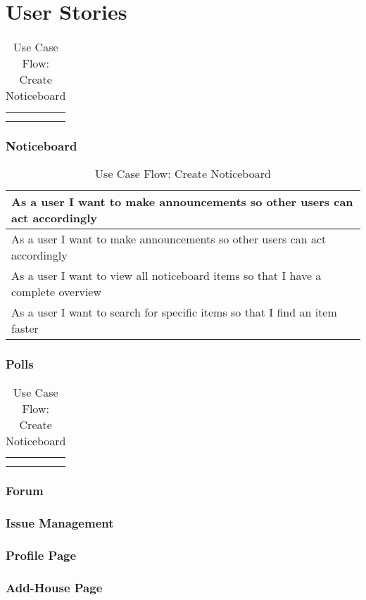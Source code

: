 \chapter{User Stories}
\begin{table}[H]
    \begin{tabularx}{\linewidth}{|X|}
      \hline
        \\
       \hline
        \\
       \hline
        \\
       \hline 
    \end{tabularx}
    \caption{Use Case Flow: Create Noticeboard}
  \end{table}

\subsection{Noticeboard}
\begin{table}[H]
    \begin{tabularx}{\linewidth}{|X|}
      \hline
        As a user I want to make announcements so other users can act accordingly \\
       \hline
       As a user I want to make announcements so other users can act accordingly \\
       \hline
        As a user I want to view all noticeboard items so that I have a complete overview \\
       \hline
        As a user I want to search for specific items so that I find an item faster \\
       \hline 
    \end{tabularx}
    \caption{Use Case Flow: Create Noticeboard}
  \end{table}


\subsection{Polls}
\begin{table}[H]
    \begin{tabularx}{\linewidth}{|X|}
      \hline
        \\
       \hline
        \\
       \hline
        \\
       \hline 
    \end{tabularx}
    \caption{Use Case Flow: Create Noticeboard}
  \end{table}

\subsection{Forum}

\subsection{Issue Management}

\subsection{Profile Page}

\subsection{Add-House Page}

